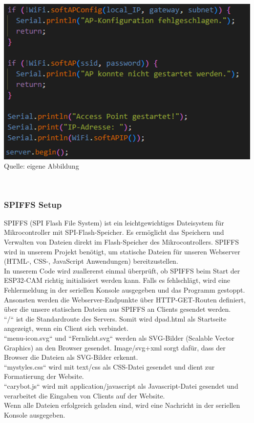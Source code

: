 \documentclass[ngerman,12pt,a4paper]{article}
\begin{document}
	\begin{minipage}{\textwidth}
		\centering
		\includegraphics[scale=0.7]{Pictures/server-setup}
		\label{fig:server-setup}
		\vspace{-2pt}
		\small Quelle: eigene Abbildung
	\end{minipage} \\[0.75cm]
			
			\subsubsection{SPIFFS Setup}
			
	SPIFFS (SPI Flash File System) ist ein leichtgewichtiges Dateisystem für Mikrocontroller mit SPI-Flash-Speicher. Es ermöglicht das Speichern und Verwalten von Dateien direkt im Flash-Speicher des Mikrocontrollers. SPIFFS wird in unserem Projekt benötigt, um statische Dateien für unseren Webserver (HTML-, CSS-, JavaScript Anwendungen) bereitzustellen. \\[0.5cm] 
	In unserem Code wird zuallererst einmal überprüft, ob SPIFFS beim Start der ESP32-CAM richtig initialisiert werden kann. Falls es fehlschlägt, wird eine Fehlermeldung in der seriellen Konsole ausgegeben und das Programm gestoppt. Ansonsten werden die Webserver-Endpunkte über HTTP-GET-Routen definiert, über die unsere statischen Dateien aus SPIFFS an Clients gesendet werden. \\[0.5cm] 
	“/“ ist die Standardroute des Servers. Somit wird dpad.html als Startseite angezeigt, wenn ein Client sich verbindet. \\[0.5cm] 
	“menu-icon.svg“ und “Fernlicht.svg“ werden als SVG-Bilder (Scalable Vector Graphics) an den Browser gesendet. Image/svg+xml sorgt dafür, dass der Browser die Dateien als SVG-Bilder erkennt. \\[0.5cm] 
	“mystyles.css“ wird mit text/css als CSS-Datei gesendet und dient zur Formatierung der Website. \\[0.5cm] 
	“carybot.js“ wird mit application/javascript als Javascript-Datei gesendet und verarbeitet die Eingaben von Clients auf der Website. \\[0.5cm] 
	Wenn alle Dateien erfolgreich geladen sind, wird eine Nachricht in der seriellen Konsole ausgegeben. \\
	
\end{document}
